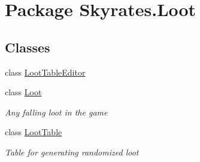 \hypertarget{namespace_skyrates_1_1_loot}{\section{Package Skyrates.\-Loot}
\label{namespace_skyrates_1_1_loot}
}
\subsection*{Classes}
\begin{DoxyCompactItemize}
\item 
class \hyperlink{class_skyrates_1_1_loot_1_1_loot_table_editor}{Loot\-Table\-Editor}
\item 
class \hyperlink{class_skyrates_1_1_loot_1_1_loot}{Loot}
\begin{DoxyCompactList}\small\item\em Any falling loot in the game \end{DoxyCompactList}\item 
class \hyperlink{class_skyrates_1_1_loot_1_1_loot_table}{Loot\-Table}
\begin{DoxyCompactList}\small\item\em Table for generating randomized loot \end{DoxyCompactList}\end{DoxyCompactItemize}
